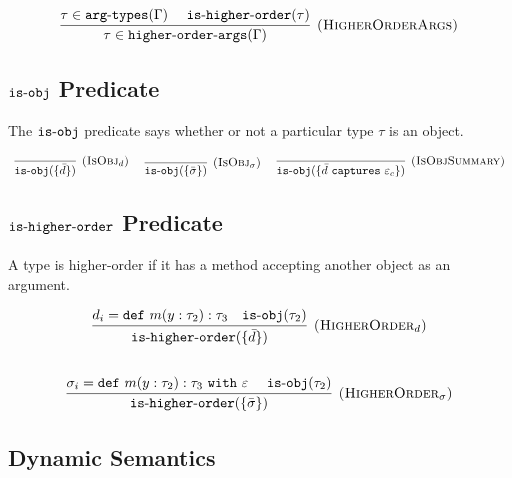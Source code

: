 \documentclass{llncs}
\newcommand{\keywadj}[1]{\mathtt{#1}}
\newcommand{\keyw}[1]{\keywadj{#1}~}
\newcommand{\kw}[1]{\keyw{ #1 }}
\newcommand{\kwa}[1]{\keywadj{ #1 }}
\newcommand{\hyphen}{\hbox{-}}
\begin{document}
\[
\begin{array}{c}

\infer[\textsc{(HigherOrderArgs)}]
	{\tau \in \kwa{higher \hyphen order \hyphen args}(\Gamma)}
	{\tau \in \kwa{arg \hyphen types}(\Gamma) ~~~~ \kwa{is \hyphen higher \hyphen order}(\tau)}

\end{array}
\]

\subsection{$\keywadj{is \hyphen obj}$ Predicate}

\noindent
The $\kwa{is \hyphen obj}$ predicate says whether or not a particular type $\tau$ is an object.

\[
\begin{array}{c}

\infer[\textsc{(IsObj$_d$)}]
	{\kwa{is \hyphen obj}(\{ \bar d \})}
	{}
	
	~~~~
	
	\infer[\textsc{(IsObj$_\sigma$)}]
	{\kwa{is \hyphen obj}(\{ \bar \sigma \})}
	{}
	
	~~~~
	
	\infer[\textsc{(IsObjSummary)}]
	{\kwa{is \hyphen obj}(\{ \bar d~\kw{captures} \varepsilon_c\})}
	{}

\end{array}
\]

\subsection{$\kwa{is \hyphen higher \hyphen order}$ Predicate}

A type is higher-order if it has a method accepting another object as an argument.


\[
\begin{array}{c}

\infer[\textsc{(HigherOrder$_d$)}]
	{\kwa{is \hyphen higher \hyphen order}(\{ \bar d \})}
	{d_i = \kwa{def}~m(y: \tau_2): \tau_3 ~~~\kwa{is \hyphen obj}(\tau_2)}
	\\[5ex]
	\infer[\textsc{(HigherOrder$_\sigma$)}]
	{\kwa{is \hyphen higher \hyphen order}(\{ \bar \sigma \})}
	{\sigma_i = \kwa{def}~m(y: \tau_2): \tau_3 ~\kw{with} \varepsilon ~~~~ \kwa{is \hyphen obj}(\tau_2)}

\end{array}
\]

\subsection{Dynamic Semantics}
\end{document}

